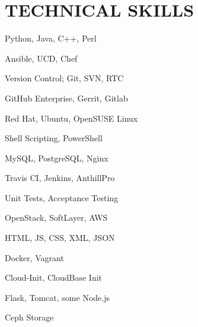 \documentclass[]{dylan-resume}
\begin{document}
\begin{minipage}[t]{1.00\textwidth}
\section{TECHNICAL SKILLS}
\begin{center}
\begin{minipage}[b]{0.33333\textwidth}
\raggedright
Python, Java, C++, Perl \par
Ansible, UCD, Chef \par
Version Control; Git, SVN, RTC \par
GitHub Enterprise, Gerrit, Gitlab \par
Red Hat, Ubuntu, OpenSUSE Linux \par
\end{minipage}%
\begin{minipage}[b]{0.33333\textwidth}
\centering
Shell Scripting, PowerShell \par
MySQL, PostgreSQL, Nginx \par
Travis CI, Jenkins, AnthillPro \par
Unit Tests, Acceptance Testing \par
OpenStack, SoftLayer, AWS
\end{minipage}%
\begin{minipage}[b]{0.33333\textwidth}
\raggedleft
HTML, JS, CSS, XML, JSON \par
Docker, Vagrant \par
Cloud-Init, CloudBase Init \par
Flask, Tomcat, some Node.js \par
Ceph Storage
\end{minipage}
\end{center}


\end{minipage}
\end{document}
